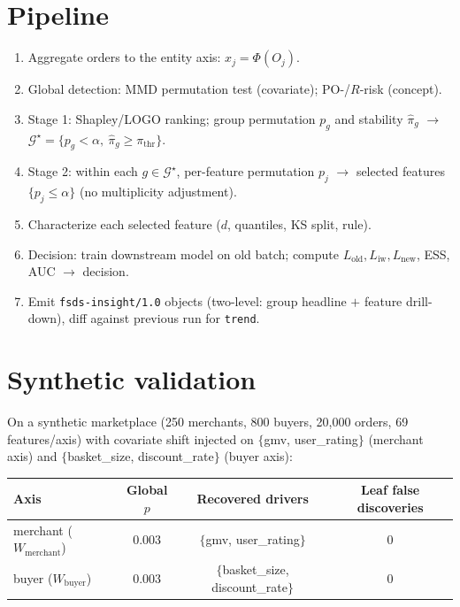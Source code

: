 \documentclass[11pt]{article}
\newcommand{\Gcal}{\mathcal{G}}
\begin{document}
\section{Pipeline}

\begin{enumerate}[leftmargin=2em]
\item Aggregate orders to the entity axis: $x_j=\Phi(O_j)$.
\item Global detection: MMD permutation test (covariate); PO-/$R$-risk (concept).
\item Stage 1: Shapley/LOGO ranking; group permutation $p_g$ and stability
      $\hat\pi_g$ $\to$ $\Gcal^\star=\{p_g<\alpha,\ \hat\pi_g\ge\pi_{\mathrm{thr}}\}$.
\item Stage 2: within each $g\in\Gcal^\star$, per-feature permutation $p_j$
      $\to$ selected features $\{p_j\le\alpha\}$ (no multiplicity adjustment).
\item Characterize each selected feature ($d$, quantiles, KS split, rule).
\item Decision: train downstream model on old batch; compute
      $L_{\mathrm{old}},L_{\mathrm{iw}},L_{\mathrm{new}}$, ESS, AUC $\to$ decision.
\item Emit \texttt{fsds-insight/1.0} objects (two-level: group headline $+$ feature
      drill-down), diff against previous run for \texttt{trend}.
\end{enumerate}

\section{Synthetic validation}

On a synthetic marketplace (250 merchants, 800 buyers, 20{,}000 orders, 69
features/axis) with covariate shift injected on $\{$gmv, user\_rating$\}$
(merchant axis) and $\{$basket\_size, discount\_rate$\}$ (buyer axis):

\begin{center}
\begin{tabular}{lccc}
\toprule
Axis & Global $p$ & Recovered drivers & Leaf false discoveries \\
\midrule
merchant ($W_{\text{merchant}}$) & $0.003$ & $\{$gmv, user\_rating$\}$ & $0$ \\
buyer ($W_{\text{buyer}}$) & $0.003$ & $\{$basket\_size, discount\_rate$\}$ & $0$ \\
\bottomrule
\end{tabular}
\end{center}
\end{document}
